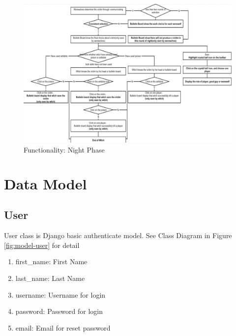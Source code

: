 \documentclass[11pt]{article}
\begin{document}
\begin{figure}
\centering
\includegraphics[width=0.9\linewidth, keepaspectratio]{func-nightphase.png}
\caption{Functionality: Night Phase}
\label{fig:func-nightphase}
\end{figure}

\section{Data Model}
\subsection{User}
User class is Django basic authenticate model. See Class Diagram in Figure \ref{fig:model-user} for detail

\begin{enumerate}
\item
first\_name: First Name
\item
last\_name: Last Name
\item
username: Username for login
\item
password: Password for login
\item
email: Email for reset password
\end{enumerate}
\end{document}
